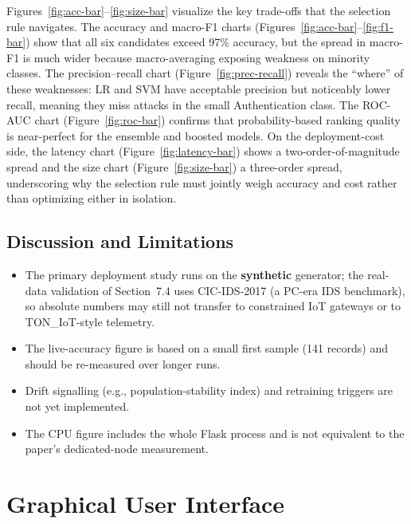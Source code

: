 \documentclass[12pt,a4paper]{article}
\begin{document}
Figures~\ref{fig:acc-bar}--\ref{fig:size-bar} visualize the key trade-offs that the
selection rule navigates. The accuracy and macro-F1 charts
(Figures~\ref{fig:acc-bar}--\ref{fig:f1-bar}) show that all six candidates exceed
97\% accuracy, but the spread in macro-F1 is much wider because macro-averaging
exposing weakness on minority classes. The precision--recall chart
(Figure~\ref{fig:prec-recall}) reveals the ``where'' of these weaknesses: LR and SVM
have acceptable precision but noticeably lower recall, meaning they miss attacks in
the small Authentication class. The ROC-AUC chart (Figure~\ref{fig:roc-bar}) confirms
that probability-based ranking quality is near-perfect for the ensemble and boosted
models. On the deployment-cost side, the latency chart (Figure~\ref{fig:latency-bar})
shows a two-order-of-magnitude spread and the size chart (Figure~\ref{fig:size-bar})
a three-order spread, underscoring why the selection rule must jointly weigh accuracy
and cost rather than optimizing either in isolation.

\subsection{Discussion and Limitations}
\begin{itemize}
  \item The primary deployment study runs on the \textbf{synthetic} generator; the
        real-data validation of Section~7.4 uses CIC-IDS-2017 (a PC-era IDS
        benchmark), so absolute numbers may still not transfer to constrained IoT
        gateways or to TON\_IoT-style telemetry.
  \item The live-accuracy figure is based on a small first sample (141 records) and
        should be re-measured over longer runs.
  \item Drift signalling (e.g., population-stability index) and retraining triggers
        are not yet implemented.
  \item The CPU figure includes the whole Flask process and is not equivalent to the
        paper's dedicated-node measurement.
\end{itemize}

\clearpage
\section{Graphical User Interface}
\end{document}
